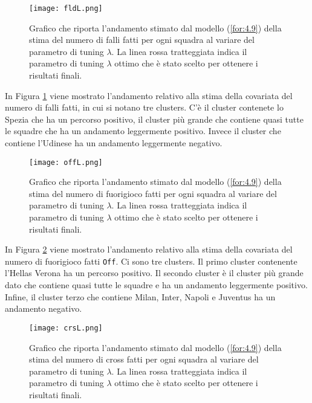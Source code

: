 \begin{figure}[htbp]
	\begin{center}
		\texttt{[image: fldL.png]}
		\caption{Grafico che riporta l'andamento stimato dal modello (\ref{for:4.9}) della stima del numero di falli fatti per ogni squadra al variare del parametro di tuning $\lambda$. La linea rossa tratteggiata indica il parametro di tuning $\lambda$ ottimo che è stato scelto per ottenere i risultati finali.} \label{fig:fldL}
	\end{center}
\end{figure}

In Figura \ref{fig:fldL} viene mostrato l'andamento relativo alla stima della covariata del numero di falli fatti, in cui si notano tre clusters. C'è il cluster contenete lo Spezia che ha un percorso positivo, il cluster più grande che contiene quasi tutte le squadre che ha un andamento leggermente positivo. Invece il cluster che contiene l'Udinese ha un andamento leggermente negativo.

\begin{figure}[htbp]
	\begin{center}
		\texttt{[image: offL.png]}
		\caption{Grafico che riporta l'andamento stimato dal modello (\ref{for:4.9}) della stima del numero di fuorigioco fatti per ogni squadra al variare del parametro di tuning $\lambda$. La linea rossa tratteggiata indica il parametro di tuning $\lambda$ ottimo che è stato scelto per ottenere i risultati finali.} \label{fig:offL}
	\end{center}
\end{figure}

In Figura \ref{fig:offL} viene mostrato l'andamento relativo alla stima della covariata del numero di fuorigioco fatti \texttt{Off}. Ci sono tre clusters. Il primo cluster contenente l'Hellas Verona ha un percorso positivo. Il secondo cluster è il cluster più grande dato che contiene quasi tutte le squadre e ha un andamento leggermente positivo. Infine, il cluster terzo che contiene Milan, Inter, Napoli e Juventus ha un andamento negativo.

\begin{figure}[htbp]
	\begin{center}
		\texttt{[image: crsL.png]}
		\caption{Grafico che riporta l'andamento stimato dal modello (\ref{for:4.9}) della stima del numero di cross fatti per ogni squadra al variare del parametro di tuning $\lambda$. La linea rossa tratteggiata indica il parametro di tuning $\lambda$ ottimo che è stato scelto per ottenere i risultati finali.} \label{fig:crsL}
	\end{center}
\end{figure}

